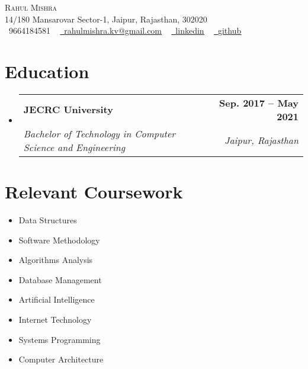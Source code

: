 \documentclass[letterpaper,11pt]{article}
\makeatletter
\newcommand{\resumeSubheading}[4]{
  \vspace{-2pt}\item
    \begin{tabular*}{1.0\textwidth}[t]{l@{\extracolsep{\fill}}r}
      \textbf{#1} & \textbf{\small #2} \\
      \textit{\small#3} & \textit{\small #4} \\
    \end{tabular*}\vspace{-7pt}
}
\newcommand{\resumeSubHeadingListStart}{\begin{itemize}[leftmargin=0.0in, label={}]}
\newcommand{\resumeSubHeadingListEnd}{\end{itemize}}
\makeatother
\begin{document}
\begin{center}
    {\Huge \scshape Rahul Mishra} \\ \vspace{1pt}
    14/180 Mansarovar Sector-1, Jaipur, Rajasthan, 302020 \\ \vspace{1pt}
    \small \raisebox{-0.1\height}\faPhone\ 9664184581 ~ \href{mailto:rahulmishra.kv@gmail.com}{\raisebox{-0.2\height}\faEnvelope\  \underline{rahulmishra.kv@gmail.com}} ~ 
    \href{https://linkedin.com/in/heyrmi/}{\raisebox{-0.2\height}\faLinkedin\ \underline{linkedin}}  ~
    \href{https://github.com/heyrmi}{\raisebox{-0.2\height}\faGithub\ \underline{github}}
    \vspace{-8pt}
\end{center}


\section{Education}
  \resumeSubHeadingListStart
    \resumeSubheading
      {JECRC University}{Sep. 2017 -- May 2021}
      {Bachelor of Technology in Computer Science and Engineering}{Jaipur, Rajasthan}
  \resumeSubHeadingListEnd

\section{Relevant Coursework}
        \begin{multicols}{4}
            \begin{itemize}[itemsep=-5pt, parsep=3pt]
                \item\small Data Structures
                \item Software Methodology
                \item Algorithms Analysis
                \item Database Management
                \item Artificial Intelligence
                \item Internet Technology
                \item Systems Programming
                \item Computer Architecture
            \end{itemize}
        \end{multicols}
        \vspace*{2.0\multicolsep}
\end{document}
